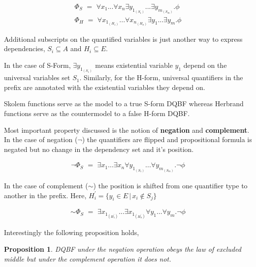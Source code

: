 \documentclass{article}
\newtheorem{prop}{Proposition}
\begin{document}
\begin{align}
	\Phi_{S} \,\, = \,\, \forall x_{1}... \forall x_{n} \exists y_{1_{(S_{1})}}...\exists y_{m_{(S_{m})}} . \phi \label{eq1}\\
	\Phi_{H}  \,\, = \,\, \forall x_{1_{(H_{1})}}... \forall x_{n_{(H_{n})}} \exists y_{1}...\exists y_{m} . \phi \label{eq2}
\end{align}

Additional subscripts on the quantified variables is just another way to express dependencies, $S_{i} \subseteq A$ and $H_{i} \subseteq E$.

In the case of S-Form, $\exists y_{1_{(S_{1})}}$ means  existential variable $y_{1}$ depend on the universal variables set $S_{1}$. 
%
Similarly, for the H-form, universal quantifiers in the prefix are annotated with the existential variables they depend on. 
     
Skolem functions serve as the model to a true S-form DQBF whereas Herbrand functions serve as the countermodel to a false H-form DQBF.

Most important property discussed is the notion of \textbf{negation} and \textbf{complement}.
%
In the case of negation ($\neg$) the quantifiers are flipped and propositional formula is negated but no change in the dependency set and it's position.
 
\begin{align}
\neg \Phi_{S} \,\, =   \,\, \exists x_{1}... \exists x_{n} \forall y_{1_{(S_{1})}}...\forall y_{m_{(S_{m})}} . \neg \phi \label{eq3}
\end{align}
 
In the case of complement ($\sim$) the position is shifted from one quantifier type to another in the prefix. Here, $H^{\prime}_{i} = \{ y_{i} \in E \, | \, x_{i} \notin S_{j} \}$
 
\begin{align}
 \sim \Phi_{S} \,\, =   \,\, \exists x_{1_{(H^{\prime}_1)}}... \exists x_{1_{(H^{\prime}_n)}} \forall y_{1}...\forall y_{m} . \neg \phi \label{eq4}
\end{align}
 
Interestingly the following proposition holds, 
\begin{prop}
	DQBF under the negation operation obeys the law of excluded middle but under the complement operation it does not.
\end{prop} 
\end{document}
